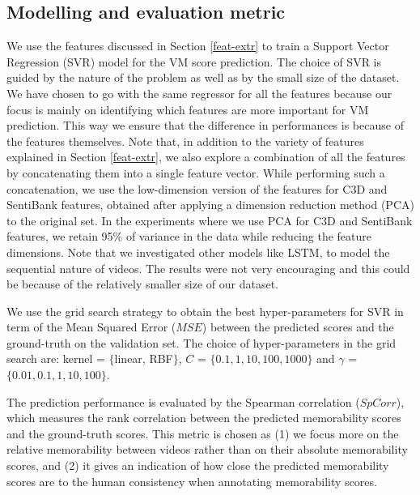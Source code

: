 \documentclass[sigconf]{acmart}
\begin{document}
\subsection{Modelling and evaluation metric}
\label{model-eval}
We use the features discussed in Section \ref{feat-extr} to train a Support Vector Regression (SVR) model for the VM score prediction. The choice of SVR is guided by the nature of the problem as well as by the small size of the dataset. We have chosen to go with the same regressor for all the features because our focus is mainly on identifying which features are more important for VM prediction. This way we ensure that the difference in performances is because of the features themselves. Note that, in addition to the variety of features explained in Section \ref{feat-extr}, we also explore a combination of all the features by concatenating them into a single feature vector.
While performing such a concatenation, we use the low-dimension version of the features for C3D and SentiBank features, obtained after applying a dimension reduction method (PCA) to the original set. In the experiments where we use PCA for C3D and SentiBank features, we retain 95\% of variance in the data while reducing the feature dimensions. Note that we investigated other models like LSTM, to model the sequential nature of videos. The results were not very encouraging and this could be because of the relatively smaller size of our dataset.

We use the grid search strategy to obtain the best hyper-parameters for SVR in term of the Mean Squared Error ($MSE$) between the predicted scores and the ground-truth on the validation set. The choice of hyper-parameters in the grid search are: kernel = $\{$linear, RBF$\}$, $C$ = $\{0.1, 1, 10, 100, 1000\}$ and $\gamma$ = $\{0.01, 0.1, 1, 10, 100\}$.

The prediction performance is evaluated by the Spearman correlation ($SpCorr$), which measures the rank correlation between the predicted memorability scores and the ground-truth scores. This metric is chosen as (1) we focus more on the relative memorability between videos rather than on  their absolute memorability scores, and (2) it gives an indication of how close the predicted memorability scores are to the human consistency when annotating memorability scores.
\end{document}
